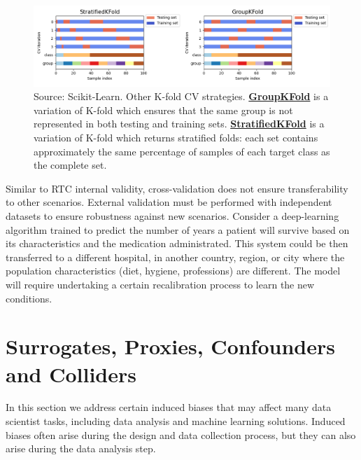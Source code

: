 \documentclass[
]{book}
\begin{document}
\begin{figure}

{\centering \includegraphics[width=1\linewidth]{Figures/kfold-strategies} 

}

\caption{Source: Scikit-Learn. Other K-fold CV strategies. \href{https://scikit-learn.org/stable/modules/cross_validation.html\#group-k-fold}{\textbf{GroupKFold}} is a variation of K-fold which ensures that the same group is not represented in both testing and training sets. \href{https://scikit-learn.org/stable/modules/cross_validation.html\#stratified-k-fold}{\textbf{StratifiedKFold}} is a variation of K-fold which returns stratified folds: each set contains approximately the same percentage of samples of each target class as the complete set.}\label{fig:k-fold-strategies}
\end{figure}

Similar to RTC internal validity, cross-validation does not ensure transferability to other scenarios. External validation must be performed with independent datasets to ensure robustness against new scenarios. Consider a deep-learning algorithm trained to predict the number of years a patient will survive based on its characteristics and the medication administrated. This system could be then transferred to a different hospital, in another country, region, or city where the population characteristics (diet, hygiene, professions) are different. The model will require undertaking a certain recalibration process to learn the new conditions.

\hypertarget{surrogates-proxies-confounders-and-colliders}{%
\section{Surrogates, Proxies, Confounders and Colliders}\label{surrogates-proxies-confounders-and-colliders}}

In this section we address certain induced biases that may affect many data scientist tasks, including data analysis and machine learning solutions. Induced biases often arise during the design and data collection process, but they can also arise during the data analysis step.
\end{document}

